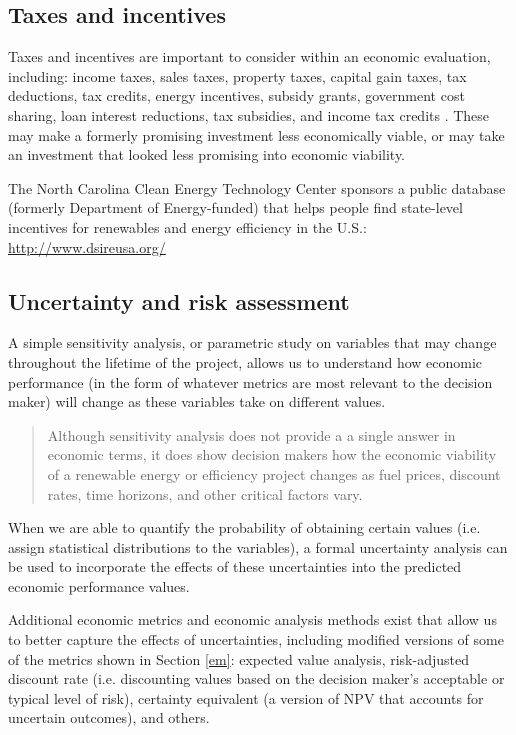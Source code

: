 \documentclass[10pt]{article}
\begin{document}
\subsection{Taxes and incentives}

Taxes and incentives are important to consider within an economic evaluation, including: income taxes, sales taxes, property taxes, capital gain taxes, tax deductions, tax credits, energy incentives, subsidy grants, government cost sharing, loan interest reductions, tax subsidies, and income tax credits \cite{Goswami2007-hf}. These may make a formerly promising investment less economically viable, or may take an investment that looked less promising into economic viability.

The North Carolina Clean Energy Technology Center sponsors a public database (formerly Department of Energy-funded) that helps people find state-level incentives for renewables and energy efficiency in the U.S.: \url{http://www.dsireusa.org/}

\subsection{Uncertainty and risk assessment}

A simple sensitivity analysis, or parametric study on variables that may change throughout the lifetime of the project, allows us to understand how economic performance (in the form of whatever metrics are most relevant to the decision maker) will change as these variables take on different values.

\begin{quote}
    Although sensitivity analysis does not provide a a single answer in economic terms, it does show decision makers how the economic viability of a renewable energy or efficiency project changes as fuel prices, discount rates, time horizons, and other critical factors vary. \cite{Goswami2007-hf}
\end{quote}

When we are able to quantify the probability of obtaining certain values (i.e. assign statistical distributions to the variables), a formal uncertainty analysis can be used to incorporate the effects of these uncertainties into the predicted economic performance values.

Additional economic metrics and economic analysis methods exist that allow us to better capture the effects of uncertainties, including modified versions of some of the metrics shown in Section \ref{em}: expected value analysis, risk-adjusted discount rate (i.e. discounting values based on the decision maker's acceptable or typical level of risk), certainty equivalent (a version of NPV that accounts for uncertain outcomes), and others.
\end{document}
